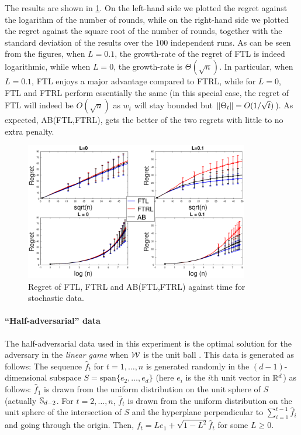 The results are shown in \cref{res:stoch}.
On the left-hand side we plotted the regret against the logarithm of the number of rounds, while on the right-hand side
we plotted the regret against the square root of the number of rounds, together with the standard deviation of the results
over the $100$ independent runs.
As can be seen from the figures,
when $L=0.1$, the growth-rate of the regret of FTL is indeed logarithmic, while when $L=0$, the growth-rate is
$\Theta(\sqrt{n})$. In particular, when $L=0.1$, FTL enjoys a major advantage compared to FTRL,
while for $L=0$, FTL and FTRL perform essentially the same (in this special case, the regret of FTL will indeed 
be $O(\sqrt{n})$ as $w_t$ will stay bounded but $\left\| \Theta_t \right\| = O(1/\sqrt{t})$).
As expected, AB(FTL,FTRL), gets the better of the two regrets with little to no extra penalty.

\begin{figure}[th]
	\centering
	\includegraphics[height = 6cm]{figures/ExpResults/Stoc_normalized}
	\caption{Regret of FTL, FTRL and AB(FTL,FTRL) against time for stochastic data. \label{res:stoch}}
\end{figure}

\paragraph{``Half-adversarial'' data}
The half-adversarial data used in this experiment is the optimal solution for the adversary 
in the \emph{linear game} when $\mathcal{W}$ is the unit ball \citep{abernethy2008optimal}. 
This data is generated as follows:
The sequence $\hat{f}_t$ for $t = 1, \ldots, n$ is generated randomly
in the $(d-1)$-dimensional subspace $S = \text{span}\{e_2, \ldots, e_d\}$ (here $e_i$ is the $i$th unit vector in $\mathbb{R}^d$) as follows:
$\hat{f}_1$ is drawn from the uniform distribution on the unit sphere of $S$ (actually $\mathbb{S}_{d-2}$. 
For $t = 2, \ldots, n$, $\hat{f}_t$ is drawn from the uniform distribution on the unit sphere
of the intersection of $S$ and the hyperplane perpendicular to $\sum_{i=1}^{t-1} \hat{f}_i$ and going through the origin.
Then, $f_t = Le_1 + \sqrt{1-L^2} \hat{f}_t$ for some $L \ge 0$.

